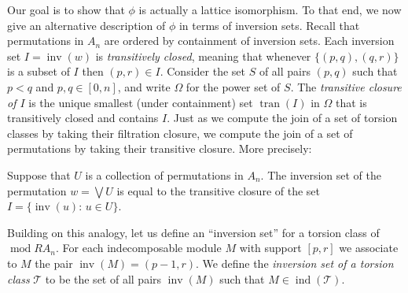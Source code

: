 \documentclass[ALCO,ThmDefs,Unicode,epreuves]{cedram}
\DeclareMathOperator{\ind}{ind}
\DeclareMathOperator{\inv}{inv}
\DeclareMathOperator{\module}{mod}
\newcommand{\calT}{\mathcal{T}}
\renewcommand{\Join}{\bigvee}
\newcommand{\tran}{\operatorname{tran}}
\renewcommand{\1}{\hat{1}}
\newcommand{\0}{\hat{0}}
\newcommand{\newword}[1]{\emph{#1}}
\begin{document}
Our goal is to show that $\phi$ is actually a lattice isomorphism.
To that end, we now give an alternative description of $\phi$ in terms of inversion sets.
Recall that permutations in $A_n$ are ordered by containment of inversion sets.
Each inversion set $I = \inv(w)$ is \newword{transitively closed}, meaning that whenever $\{(p,q), (q,r)\}$ is a subset of $I$ then $(p,r)\in I$.
Consider the set $S$ of all pairs $(p,q)$ such that $p<q$ and $p,q\in [0,n]$, and write $\Omega$ for the power set of $S$.
The \newword{transitive closure of $I$} is the unique smallest (under containment) set $\tran(I)$ in $\Omega$ that is transitively closed and contains $I$.
Just as we compute the join of a set of torsion classes by taking their filtration closure, we compute the join of a set of permutations by taking their transitive closure.
More precisely:
\begin{proposition}\label{join of perms}
Suppose that $U$ is a collection of permutations in $A_n$.
The inversion set of the permutation $w=\Join U$ is equal to the transitive closure of the set $I= \{\inv(u):\, u\in U\}$.
\end{proposition}


Building on this analogy, let us define an ``inversion set'' for a torsion class of~$\module RA_n$.
For each indecomposable module $M$ with support $[p,r]$ we associate to $M$ the pair $\inv(M) = (p-1,r)$.
We define the \newword{inversion set of a torsion class} $\calT$ to be the set of all pairs $\inv(M)$ such that $M\in \ind(\calT)$.
\end{document}
